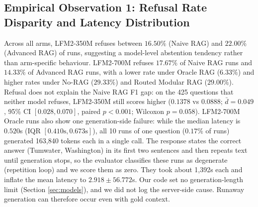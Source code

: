 \documentclass[10pt]{article}
\begin{document}
\subsection{Empirical Observation 1: Refusal Rate Disparity and Latency Distribution}
Across all arms, LFM2-350M refuses between $16.50\%$ (Naive RAG) and $22.00\%$ (Advanced RAG) of runs, suggesting a model-level abstention tendency rather than arm-specific behaviour. LFM2-700M refuses $17.67\%$ of Naive RAG runs and $14.33\%$ of Advanced RAG runs, with a lower rate under Oracle RAG ($6.33\%$) and higher rates under No-RAG ($29.33\%$) and Routed Modular RAG ($29.00\%$). Refusal does not explain the Naive RAG F1 gap: on the 425 questions that neither model refuses, LFM2-350M still scores higher ($0.1378$ vs $0.0888$; $\bar{d}=0.049$, 95\% CI $[0.028, 0.070]$, paired $p<0.001$; Wilcoxon $p=0.058$). LFM2-700M Oracle runs also show one generation-side failure: while the median latency is $0.520$s (IQR $[0.410\text{s}, 0.673\text{s}]$), all 10 runs of one question ($0.17\%$ of runs) generated 163,840 tokens each in a single call. The response states the correct answer (Tumwater, Washington) in its first two sentences and then repeats text until generation stops, so the evaluator classifies these runs as degenerate (repetition loop) and we score them as zero. They took about 1,392s each and inflate the mean latency to $2.918 \pm 56.772$s. Our code set no generation-length limit (Section \ref{sec:models}), and we did not log the server-side cause. Runaway generation can therefore occur even with gold context.
\end{document}
